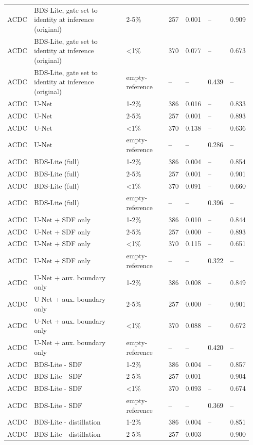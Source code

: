 \begin{longtable}{lllllll}
ACDC & BDS-Lite, gate set to identity at inference (original) & 2-5\% & 257 & 0.001 & -- & 0.909 \\
ACDC & BDS-Lite, gate set to identity at inference (original) & <1\% & 370 & 0.077 & -- & 0.673 \\
ACDC & BDS-Lite, gate set to identity at inference (original) & empty-reference & -- & -- & 0.439 & -- \\
ACDC & U-Net & 1-2\% & 386 & 0.016 & -- & 0.833 \\
ACDC & U-Net & 2-5\% & 257 & 0.001 & -- & 0.893 \\
ACDC & U-Net & <1\% & 370 & 0.138 & -- & 0.636 \\
ACDC & U-Net & empty-reference & -- & -- & 0.286 & -- \\
ACDC & BDS-Lite (full) & 1-2\% & 386 & 0.004 & -- & 0.854 \\
ACDC & BDS-Lite (full) & 2-5\% & 257 & 0.001 & -- & 0.901 \\
ACDC & BDS-Lite (full) & <1\% & 370 & 0.091 & -- & 0.660 \\
ACDC & BDS-Lite (full) & empty-reference & -- & -- & 0.396 & -- \\
ACDC & U-Net + SDF only & 1-2\% & 386 & 0.010 & -- & 0.844 \\
ACDC & U-Net + SDF only & 2-5\% & 257 & 0.000 & -- & 0.893 \\
ACDC & U-Net + SDF only & <1\% & 370 & 0.115 & -- & 0.651 \\
ACDC & U-Net + SDF only & empty-reference & -- & -- & 0.322 & -- \\
ACDC & U-Net + aux. boundary only & 1-2\% & 386 & 0.008 & -- & 0.849 \\
ACDC & U-Net + aux. boundary only & 2-5\% & 257 & 0.000 & -- & 0.901 \\
ACDC & U-Net + aux. boundary only & <1\% & 370 & 0.088 & -- & 0.672 \\
ACDC & U-Net + aux. boundary only & empty-reference & -- & -- & 0.420 & -- \\
ACDC & BDS-Lite - SDF & 1-2\% & 386 & 0.004 & -- & 0.857 \\
ACDC & BDS-Lite - SDF & 2-5\% & 257 & 0.001 & -- & 0.904 \\
ACDC & BDS-Lite - SDF & <1\% & 370 & 0.093 & -- & 0.674 \\
ACDC & BDS-Lite - SDF & empty-reference & -- & -- & 0.369 & -- \\
ACDC & BDS-Lite - distillation & 1-2\% & 386 & 0.004 & -- & 0.851 \\
ACDC & BDS-Lite - distillation & 2-5\% & 257 & 0.003 & -- & 0.900 \\

\end{longtable}
